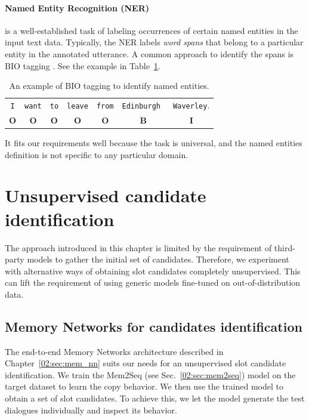 \paragraph{Named Entity Recognition (NER)} is a well-established task of labeling occurrences of certain named entities in the input text data.
Typically, the NER labels \textit{word spans} that belong to a particular entity in the annotated utterance.
A common approach to identify the spans is BIO tagging \cite{ramshaw-marcus-1995-text}.
See the example in Table~\ref{04:tab:ner_example}.
\begin{table}[tp]
    \centering
    \begin{tabular}{c|c|c|c|c|c|c}
    \toprule
        \texttt{I} & \texttt{want} & \texttt{to} & \texttt{leave} & \texttt{from} & \texttt{{\color{cyan!80!yellow!80!black!100 }Edinburgh }} & \texttt{{\color{cyan!80!yellow!80!black!100 }Waverley}}. \\
        \textbf{O} & \textbf{O} & \textbf{O} & \textbf{O} & \textbf{O} & \textbf{B} & \textbf{I}\\
    \bottomrule
    \end{tabular}
    \caption{An example of BIO tagging to identify named entities.}
    \label{04:tab:ner_example}
\end{table}
It fits our requirements well because the task is universal, and the named entities definition is not specific to any particular domain.

\section{Unsupervised candidate identification}
\label{04:sec:unsup_candidate_selection}
The approach introduced in this chapter is limited by the requirement of third-party models to gather the initial set of candidates.
Therefore, we experiment with alternative ways of obtaining slot candidates completely unsupervised.
This can lift the requirement of using generic models fine-tuned on out-of-distribution data.

\subsection{Memory Networks for candidates identification}
\label{04:sec:memnn}
The end-to-end Memory Networks architecture described in Chapter~\ref{02:sec:mem_nn} suits our needs for an unsupervised slot candidate identification.
We train the Mem2Seq (see Sec.~\ref{02:sec:mem2seq}) model on the target dataset to learn the copy behavior.
We then use the trained model to obtain a set of slot candidates.
To achieve this, we let the model generate the test dialogues individually and inspect its behavior.


